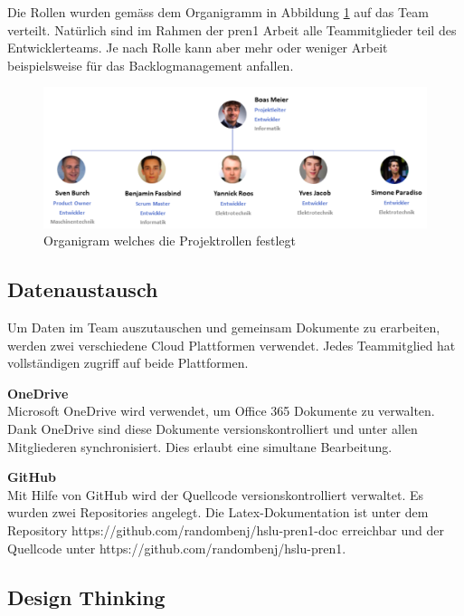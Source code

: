 \newpage

Die Rollen wurden gemäss dem Organigramm in Abbildung \ref{fig:organigramm} auf das Team verteilt. Natürlich sind im Rahmen der \acrshort{pren}1 Arbeit alle Teammitglieder teil des Entwicklerteams.
Je nach Rolle kann aber mehr oder weniger Arbeit beispielsweise für das Backlogmanagement anfallen.

\begin{figure}[H]
  \includegraphics[width=1.0\textwidth]{img/organigram}
  \centering
  \caption{Organigram welches die Projektrollen festlegt}
  \label{fig:organigramm}
\end{figure}

\subsection{Datenaustausch}
Um Daten im Team auszutauschen und gemeinsam Dokumente zu erarbeiten, werden zwei verschiedene Cloud Plattformen verwendet. Jedes Teammitglied hat vollständigen zugriff auf beide Plattformen.

\textbf{OneDrive}\\
Microsoft OneDrive wird verwendet, um Office 365 Dokumente zu verwalten. Dank OneDrive sind diese Dokumente versionskontrolliert und unter allen Mitgliederen synchronisiert. Dies erlaubt eine simultane Bearbeitung.

\textbf{GitHub}\\
Mit Hilfe von GitHub wird der Quellcode versionskontrolliert verwaltet. Es wurden zwei Repositories angelegt. Die Latex-Dokumentation ist unter dem Repository https://github.com/randombenj/hslu-pren1-doc erreichbar und der Quellcode unter https://github.com/randombenj/hslu-pren1.

\newpage

\subsection{Design Thinking}
\label{sec:design-thinking}


